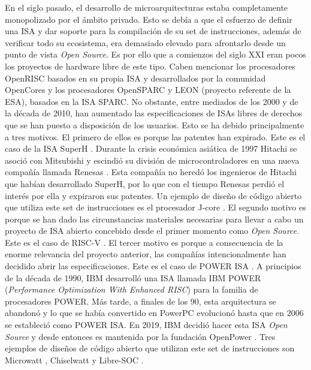 En el siglo pasado, el desarrollo de microarquitecturas estaba completamente monopolizado por el ámbito privado.
Esto se debía a que el esfuerzo de definir una ISA y dar soporte para la compilación de su set de instrucciones, además de verificar todo su ecosistema, era demasiado elevado para afrontarlo desde un punto de vista \textit{Open Source}.
Es por ello que a comienzos del siglo XXI eran pocos los proyectos de hardware libre de este tipo.
Caben mencionar los procesadores OpenRISC \cite{openrisc} basados en su propia ISA y desarrollados por la comunidad OpenCores \cite{opencores} y los procesadores OpenSPARC \cite{opensparc} y LEON \cite{leon} (proyecto referente de la ESA), basados en la ISA SPARC.
No obstante, entre mediados de los 2000 y de la década de 2010, han aumentado las especificaciones de ISAs libres de derechos que se han puesto a disposición de los usuarios.
Esto se ha debido principalmente a tres motivos.
El primero de ellos es porque las patentes han expirado.
Este es el caso de la ISA SuperH \cite{superh}.
Durante la crisis económica asiática de 1997 Hitachi se asoció con Mitsubishi y escindió su división de microcontroladores en una nueva compañía llamada Renesas \cite{new-comp}.
Esta compañía no heredó los ingenieros de Hitachi que habían desarrollado SuperH, por lo que con el tiempo Renesas perdió el interés por ella y expiraron sus patentes.
Un ejemplo de diseño de código abierto que utiliza este set de instrucciones es el procesador J-core \cite{j-core}.
El segundo motivo es porque se han dado las circunstancias materiales necesarias para llevar a cabo un proyecto de ISA abierto concebido desde el primer momento como \textit{Open Source}.
Este es el caso de RISC-V \cite{waterman13}.
El tercer motivo es porque a consecuencia de la enorme relevancia del proyecto anterior, las compañías intencionalmente han decidido abrir las especificaciones. 
Este es el caso de POWER ISA \cite{power}.
A principios de la década de 1990, IBM desarrolló una ISA llamada IBM POWER (\textit{Performance Optimization With Enhanced RISC}) para la familia de procesadores POWER.
Más tarde, a finales de los 90, esta arquitectura se abandonó y lo que se había convertido en PowerPC evolucionó hasta que en 2006 se estableció como POWER ISA. 
En 2019, IBM decidió hacer esta ISA \textit{Open Source} y desde entonces es mantenida por la fundación OpenPower \cite{open-power}.
Tres ejemplos de diseños de código abierto que utilizan este set de instrucciones son Microwatt \cite {gh:microwatt}, Chiselwatt \cite{gh:chiselwatt} y Libre-SOC \cite{libre-soc}.

